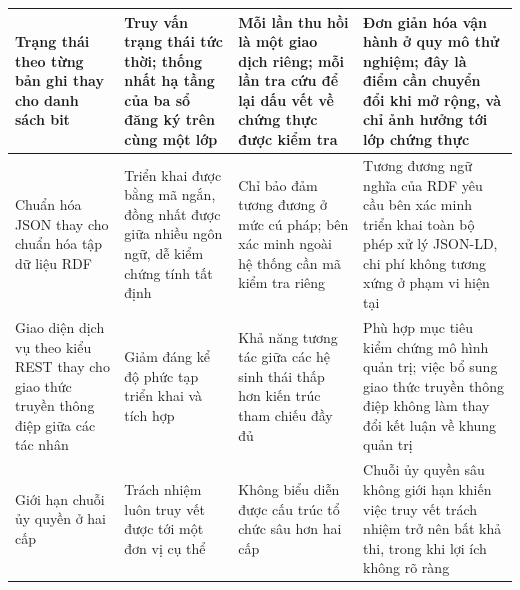 \begin{longtable}{|p{2.9cm}|p{3.6cm}|p{3.6cm}|p{3.8cm}|}
Trạng thái theo từng bản ghi thay cho danh sách bit
&
Truy vấn trạng thái tức thời; thống nhất hạ tầng của ba sổ đăng ký trên cùng một lớp
&
Mỗi lần thu hồi là một giao dịch riêng; mỗi lần tra cứu để lại dấu vết về chứng thực được kiểm tra
&
Đơn giản hóa vận hành ở quy mô thử nghiệm; đây là điểm cần chuyển đổi khi mở rộng, và chỉ ảnh hưởng tới lớp chứng thực
\\ \hline

Chuẩn hóa JSON thay cho chuẩn hóa tập dữ liệu RDF
&
Triển khai được bằng mã ngắn, đồng nhất được giữa nhiều ngôn ngữ, dễ kiểm chứng tính tất định
&
Chỉ bảo đảm tương đương ở mức cú pháp; bên xác minh ngoài hệ thống cần mã kiểm tra riêng
&
Tương đương ngữ nghĩa của RDF yêu cầu bên xác minh triển khai toàn bộ phép xử lý JSON-LD, chi phí không tương xứng ở phạm vi hiện tại
\\ \hline

Giao diện dịch vụ theo kiểu REST thay cho giao thức truyền thông điệp giữa các tác nhân
&
Giảm đáng kể độ phức tạp triển khai và tích hợp
&
Khả năng tương tác giữa các hệ sinh thái thấp hơn kiến trúc tham chiếu đầy đủ
&
Phù hợp mục tiêu kiểm chứng mô hình quản trị; việc bổ sung giao thức truyền thông điệp không làm thay đổi kết luận về khung quản trị
\\ \hline

Giới hạn chuỗi ủy quyền ở hai cấp
&
Trách nhiệm luôn truy vết được tới một đơn vị cụ thể
&
Không biểu diễn được cấu trúc tổ chức sâu hơn hai cấp
&
Chuỗi ủy quyền sâu không giới hạn khiến việc truy vết trách nhiệm trở nên bất khả thi, trong khi lợi ích không rõ ràng
\\ \hline

\end{longtable}
